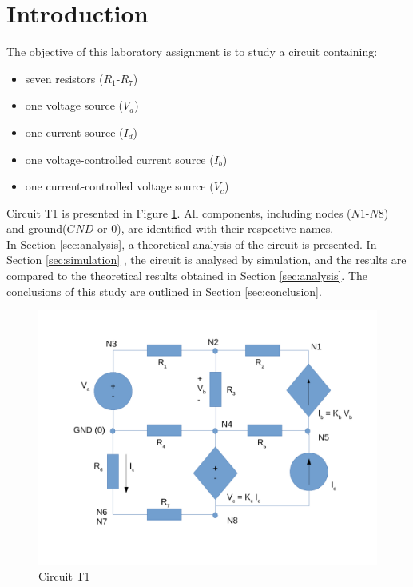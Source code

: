 \section{Introduction}
\label{sec:introduction}


The objective of this laboratory assignment is to study a circuit containing:
\begin{itemize}
	\item seven resistors ($R_1$-$R_7$)
	\item one voltage source ($V_a$)
	\item one current source ($I_d$)
	\item one voltage-controlled current source ($I_b$)
	\item one current-controlled voltage source ($V_c$)
\end{itemize}

Circuit T1 is presented in Figure \ref{fig:Desenho_t1}. All components, including nodes
($N1$-$N8$) and ground($GND$ or $0$), are identified with their respective names. \\

In Section \ref{sec:analysis}, a theoretical analysis of the circuit is
presented. In Section \ref{sec:simulation} , the circuit is analysed by
simulation, and the results are compared to the theoretical results
obtained in Section \ref{sec:analysis}. The conclusions of this study
are outlined in Section \ref{sec:conclusion}.



\begin{figure}[h]
	\centering
	\includegraphics[width=0.85\linewidth]{dsnh_t1.pdf}
	\caption{Circuit T1}
\label{fig:Desenho_t1}
\end{figure}

